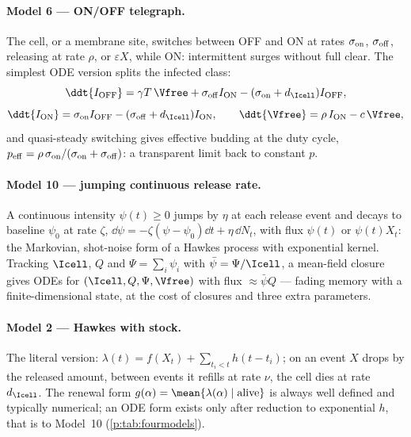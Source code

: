 \paragraph{Model 6 --- ON/OFF telegraph.} The cell, or a membrane site,
switches between OFF and ON at rates $\sigma_{\rm on}$, $\sigma_{\rm off}$,
releasing at rate $\rho$, or $\varepsilon X$, while ON: intermittent surges
without full clear. The simplest ODE version splits the infected class:
\begin{equation}
\ddt{I_{\rm OFF}}=\gamma T\,\Vfree+\sigma_{\rm off}I_{\rm ON}
-(\sigma_{\rm on}+d_{\Icell})I_{\rm OFF},
\label{p:eq:model6}
\end{equation}
\begin{equation}
\ddt{I_{\rm ON}}=\sigma_{\rm on}I_{\rm OFF}
-(\sigma_{\rm off}+d_{\Icell})I_{\rm ON},
\qquad
\ddt{\Vfree}=\rho\,I_{\rm ON}-c\,\Vfree,
\label{p:eq:model6b}
\end{equation}
and quasi-steady switching gives effective budding at the duty cycle,
$p_{\rm eff}=\rho\,\sigma_{\rm on}/(\sigma_{\rm on}+\sigma_{\rm off})$: a
transparent limit back to constant $p$.

\paragraph{Model 10 --- jumping continuous release rate.} A continuous
intensity $\psi(t)\ge0$ jumps by $\eta$ at each release event and decays to
baseline $\psi_0$ at rate $\zeta$,
$\dd\psi=-\zeta(\psi-\psi_0)\dd t+\eta\,\dd N_t$, with flux $\psi(t)$ or
$\psi(t)X_t$: the Markovian, shot-noise form of a Hawkes process with
exponential kernel. Tracking $\Icell$, $Q$ and $\Psi=\sum_i\psi_i$ with
$\bar\psi=\Psi/\Icell$, a mean-field closure gives ODEs for
$(\Icell,Q,\Psi,\Vfree)$ with flux $\approx\bar\psi Q$ --- fading memory
with a finite-dimensional state, at the cost of closures and three extra
parameters.

\paragraph{Model 2 --- Hawkes with stock.} The literal version:
$\lambda(t)=f(X_t)+\sum_{t_i<t}h(t-t_i)$; on an event $X$ drops by the
released amount, between events it refills at rate $\nu$, the cell dies at
rate $d_{\Icell}$. The renewal form
$g(\alpha)=\mean{\lambda(\alpha)\mid\text{alive}}$ is always well defined
and typically numerical; an ODE form exists only after reduction to
exponential $h$, that is to Model~10 (\cref{p:tab:fourmodels}).

